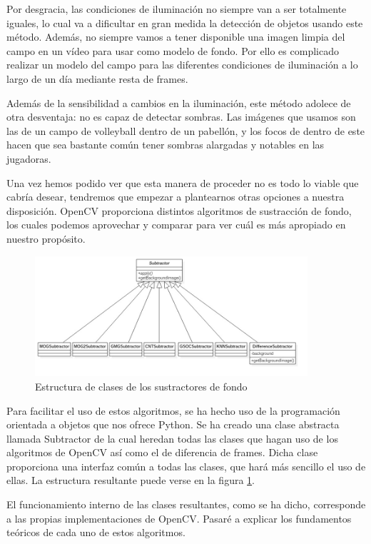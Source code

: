 Por desgracia, las condiciones de iluminación no siempre van a ser totalmente iguales, lo cual va a dificultar en gran medida la detección de objetos usando este método. Además, no siempre vamos a tener disponible una imagen limpia del campo en un vídeo para usar como modelo de fondo. Por ello es complicado realizar un modelo del campo para las diferentes condiciones de iluminación a lo largo de un día mediante resta de frames.

Además de la sensibilidad a cambios en la iluminación, este método adolece de otra desventaja: no es capaz de detectar sombras. Las imágenes que usamos son las de un campo de volleyball dentro de un pabellón, y los focos de dentro de este hacen que sea bastante común tener sombras alargadas y notables en las jugadoras.

Una vez hemos podido ver que esta manera de proceder no es todo lo viable que cabría desear, tendremos que empezar a plantearnos otras opciones a nuestra disposición. OpenCV proporciona distintos algoritmos de sustracción de fondo, los cuales podemos aprovechar y comparar para ver cuál es más apropiado en nuestro propósito.

\begin{figure}
    \centering
    \includegraphics[width=0.9\textwidth]{images/subtractors}
    \caption{Estructura de clases de los sustractores de fondo}
    \label{fig:subtractors}
\end{figure}

Para facilitar el uso de estos algoritmos, se ha hecho uso de la programación orientada a objetos que nos ofrece Python. Se ha creado una clase abstracta llamada Subtractor de la cual heredan todas las clases que hagan uso de los algoritmos de OpenCV así como el de diferencia de frames. Dicha clase proporciona una interfaz común a todas las clases, que hará más sencillo el uso de ellas. La estructura resultante puede verse en la figura \ref{fig:subtractors}.

El funcionamiento interno de las clases resultantes, como se ha dicho, corresponde a las propias implementaciones de OpenCV. Pasaré a explicar los fundamentos teóricos de cada uno de estos algoritmos.

